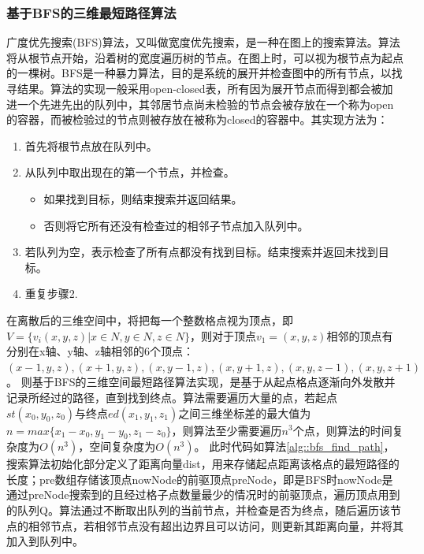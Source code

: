 \subsubsection{基于BFS的三维最短路径算法}
\par 广度优先搜索(BFS)算法，又叫做宽度优先搜索，是一种在图上的搜索算法。算法将从根节点开始，沿着树的宽度遍历树的节点。在图上时，可以视为根节点为起点的一棵树。BFS是一种暴力算法，目的是系统的展开并检查图中的所有节点，以找寻结果。算法的实现一般采用open-closed表，所有因为展开节点而得到都会被加进一个先进先出的队列中，其邻居节点尚未检验的节点会被存放在一个称为open的容器，而被检验过的节点则被存放在被称为closed的容器中。其实现方法为：
\begin{enumerate}
    \item 首先将根节点放在队列中。
    \item 从队列中取出现在的第一个节点，并检查。
    \begin{itemize}
        \item 如果找到目标，则结束搜索并返回结果。
        \item 否则将它所有还没有检查过的相邻子节点加入队列中。
    \end{itemize}
    \item 若队列为空，表示检查了所有点都没有找到目标。结束搜索并返回未找到目标。
    \item 重复步骤2.
\end{enumerate}
\par 在离散后的三维空间中，将把每一个整数格点视为顶点，即$V=\{v_i(x,y,z)|x\in N,y\in N,z\in N\}$，则对于顶点$v_1=(x,y,z)$相邻的顶点有分别在x轴、y轴、z轴相邻的6个顶点：$(x-1,y,z),(x+1,y,z),(x,y-1,z),(x,y+1,z),(x,y,z-1),(x,y,z+1)$。
则基于BFS的三维空间最短路径算法实现，是基于从起点格点逐渐向外发散并记录所经过的路径，直到找到终点。算法需要遍历大量的点，若起点$st(x_0,y_0,z_0)$与终点$ed(x_1,y_1,z_1)$之间三维坐标差的最大值为$n=max\{x_1-x_0,y_1-y_0,z_1-z_0\}$，则算法至少需要遍历$n^3$个点，则算法的时间复杂度为$O(n^3)$，空间复杂度为$O(n^3)$。
此时代码如算法\ref{alg::bfs_find_path}，搜索算法初始化部分定义了距离向量dist，用来存储起点距离该格点的最短路径的长度；pre数组存储该顶点nowNode的前驱顶点preNode，即是BFS时nowNode是通过preNode搜索到的且经过格子点数量最少的情况时的前驱顶点，遍历顶点用到的队列Q。算法通过不断取出队列的当前节点，并检查是否为终点，随后遍历该节点的相邻节点，若相邻节点没有超出边界且可以访问，则更新其距离向量，并将其加入到队列中。
